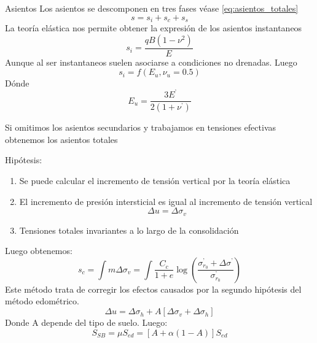 \begin{mybox}{Asientos}
Los asientos se descomponen en tres fases véase \ref{eq:asientos_totales}
\begin{equation}
	s = s_i + s_c + s_s
	\label{eq:asientos_totales}
\end{equation}
La teoría elástica nos permite obtener la expresión de los asientos instantaneos
\begin{equation}
	s_i = \frac{qB(1-\nu^2)}{E}
\end{equation}
Aunque al ser instantaneos suelen asociarse a condiciones no drenadas. Luego 
\begin{equation}
	s_i = f(E_u , \nu_u = 0.5)
\end{equation}
Dónde
\[
	E_u = \frac{3E^{’}}{2(1+\nu^{’})}
\]
\begin{myrem}
	Si omitimos los asientos secundarios y trabajamos en tensiones efectivas obtenemos los asientos totales
\end{myrem}
	Hipótesis:
	\begin{enumerate}
		\item Se puede calcular el incremento de tensión vertical por la teoría elástica
		\item El incremento de presión intersticial es igual al incremento de tensión vertical
		\[
			\Delta u = \Delta \sigma_v
		\]
		\item Tensiones totales invariantes a lo largo de la consolidación
	\end{enumerate}
	Luego obtenemos:
	\[
		s_c = \int m \Delta \sigma_v = \int \frac{C_c}{1+e}\log\left(\frac{\sigma_{r_0}^{’}+\Delta\sigma^{’}}{\sigma_{r_0}^{’}}\right)		
	\]
	Este método trata de corregir los efectos causados por la segundo hipótesis del método edométrico.
	\begin{equation}
		\Delta u = \Delta \sigma_h + A [\Delta \sigma_v + \Delta \sigma_h]
	\end{equation}
	Donde A depende del tipo de suelo.
	Luego:
	\begin{equation}
		S_{SB} =\mu S_{ed} = [A + \alpha (1-A)]S_{ed}
	\end{equation}

\end{mybox}

